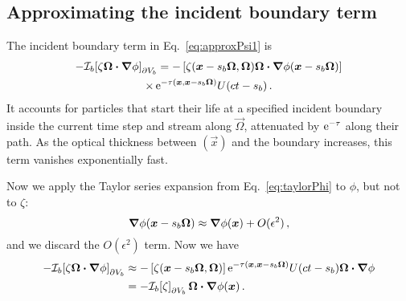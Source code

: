\subsection{Approximating the incident boundary term}
The incident boundary term in Eq.~\eqref{eq:approxPsi1} is
\begin{multline*}
-\mathcal{I}_{b}\!\left[\zeta \bm{\Omega}\bm{\cdot} \bm{\nabla} \phi\right]_{\partial V_b}
  = -\left[\zeta(\bm{x} - s_b\bm{\Omega}, \bm{\Omega})
   \bm{\Omega}\bm{\cdot} \bm{\nabla} \phi(\bm{x} - s_b\bm{\Omega}) \right]
   \\
\times
    \mathop{}\!\mathrm{e}^{ -\tau(\bm{x}, \bm{x} - s_b \bm{\Omega})}
    U(ct - s_b) \,.
\end{multline*}
It accounts for particles that start their life at a specified incident boundary
inside the current time step and stream along $\vec{\Omega}$, attenuated by
$\mathop{}\!\mathrm{e}^{-\tau}$ along their path. As the optical thickness between
$(\vec{x})$ and the boundary increases, this term vanishes
exponentially fast.

Now we apply the Taylor series expansion from Eq.~\eqref{eq:taylorPhi} to
$\phi$, but not to $\zeta$:
\begin{equation*}
  \bm{\nabla} \phi(\bm{x} - s_b\bm{\Omega})
  \approx \bm{\nabla} \phi(\bm{x}) + O(\epsilon^2)\,,
\end{equation*}
and we discard the $O(\epsilon^2)$ term. Now we have
\begin{align} \nonumber
-\mathcal{I}_{b}\!\left[\zeta \bm{\Omega}\bm{\cdot} \bm{\nabla} \phi\right]_{\partial V_b}
&\approx -\left[\zeta(\bm{x} - s_b\bm{\Omega}, \bm{\Omega}) \right]
  \mathop{}\!\mathrm{e}^{ -\tau(\bm{x}, \bm{x} - s_b \bm{\Omega})} U(ct - s_b)
  \bm{\Omega}\bm{\cdot} \bm{\nabla} \phi
 \\ \label{eq:bndyApprox}
&= -\mathcal{I}_{b}\!\left[\zeta\right]_{\partial V_b} \bm{\Omega}\bm{\cdot} \bm{\nabla} \phi(\bm{x}) \,.
\end{align}

